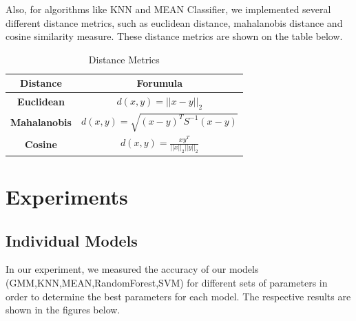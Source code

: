 \documentclass[10pt,journal,compsoc]{IEEEtran}
\begin{document}
Also, for algorithms like KNN and MEAN Classifier,
we implemented several different distance metrics,
such as euclidean distance, mahalanobis distance
and cosine similarity measure.
These distance metrics are shown on the table
below.
\begin{table}[!h]
	\renewcommand{\arraystretch}{2.5}
	\caption{Distance Metrics}
	\label{transformation}
	\centering
\begin{tabular}{|c|c|}
	\hline
	Distance & Forumula\\
	\hline
	\textbf{Euclidean} & $d(x,y) = ||x-y||_2$\\
	\hline
	\textbf{Mahalanobis} & $d(x,y) = \sqrt{(x-y)^TS^{-1}(x-y)}$\\
	\hline
	\textbf{Cosine} & $d(x,y) = \frac{xy^T}{||x||_2||y||_2}$\\
	\hline
\end{tabular}
\end{table}

\section{Experiments}
\subsection{Individual Models}
In our experiment, we measured the accuracy of
our models (GMM,KNN,MEAN,RandomForest,SVM) for
different sets of parameters in order to determine
the best parameters for each model.
The respective results are shown in the figures
below.


\end{document}
